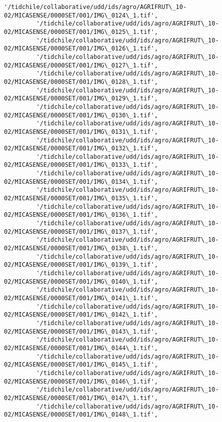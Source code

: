 \documentclass[11pt]{article}
\begin{document}
\begin{Verbatim}[commandchars=\\\{\}]
         '/tidchile/collaborative/udd/ids/agro/AGRIFRUT\_10-02/MICASENSE/0000SET/001/IMG\_0124\_1.tif',
         '/tidchile/collaborative/udd/ids/agro/AGRIFRUT\_10-02/MICASENSE/0000SET/001/IMG\_0125\_1.tif',
         '/tidchile/collaborative/udd/ids/agro/AGRIFRUT\_10-02/MICASENSE/0000SET/001/IMG\_0126\_1.tif',
         '/tidchile/collaborative/udd/ids/agro/AGRIFRUT\_10-02/MICASENSE/0000SET/001/IMG\_0127\_1.tif',
         '/tidchile/collaborative/udd/ids/agro/AGRIFRUT\_10-02/MICASENSE/0000SET/001/IMG\_0128\_1.tif',
         '/tidchile/collaborative/udd/ids/agro/AGRIFRUT\_10-02/MICASENSE/0000SET/001/IMG\_0129\_1.tif',
         '/tidchile/collaborative/udd/ids/agro/AGRIFRUT\_10-02/MICASENSE/0000SET/001/IMG\_0130\_1.tif',
         '/tidchile/collaborative/udd/ids/agro/AGRIFRUT\_10-02/MICASENSE/0000SET/001/IMG\_0131\_1.tif',
         '/tidchile/collaborative/udd/ids/agro/AGRIFRUT\_10-02/MICASENSE/0000SET/001/IMG\_0132\_1.tif',
         '/tidchile/collaborative/udd/ids/agro/AGRIFRUT\_10-02/MICASENSE/0000SET/001/IMG\_0133\_1.tif',
         '/tidchile/collaborative/udd/ids/agro/AGRIFRUT\_10-02/MICASENSE/0000SET/001/IMG\_0134\_1.tif',
         '/tidchile/collaborative/udd/ids/agro/AGRIFRUT\_10-02/MICASENSE/0000SET/001/IMG\_0135\_1.tif',
         '/tidchile/collaborative/udd/ids/agro/AGRIFRUT\_10-02/MICASENSE/0000SET/001/IMG\_0136\_1.tif',
         '/tidchile/collaborative/udd/ids/agro/AGRIFRUT\_10-02/MICASENSE/0000SET/001/IMG\_0137\_1.tif',
         '/tidchile/collaborative/udd/ids/agro/AGRIFRUT\_10-02/MICASENSE/0000SET/001/IMG\_0138\_1.tif',
         '/tidchile/collaborative/udd/ids/agro/AGRIFRUT\_10-02/MICASENSE/0000SET/001/IMG\_0139\_1.tif',
         '/tidchile/collaborative/udd/ids/agro/AGRIFRUT\_10-02/MICASENSE/0000SET/001/IMG\_0140\_1.tif',
         '/tidchile/collaborative/udd/ids/agro/AGRIFRUT\_10-02/MICASENSE/0000SET/001/IMG\_0141\_1.tif',
         '/tidchile/collaborative/udd/ids/agro/AGRIFRUT\_10-02/MICASENSE/0000SET/001/IMG\_0142\_1.tif',
         '/tidchile/collaborative/udd/ids/agro/AGRIFRUT\_10-02/MICASENSE/0000SET/001/IMG\_0143\_1.tif',
         '/tidchile/collaborative/udd/ids/agro/AGRIFRUT\_10-02/MICASENSE/0000SET/001/IMG\_0144\_1.tif',
         '/tidchile/collaborative/udd/ids/agro/AGRIFRUT\_10-02/MICASENSE/0000SET/001/IMG\_0145\_1.tif',
         '/tidchile/collaborative/udd/ids/agro/AGRIFRUT\_10-02/MICASENSE/0000SET/001/IMG\_0146\_1.tif',
         '/tidchile/collaborative/udd/ids/agro/AGRIFRUT\_10-02/MICASENSE/0000SET/001/IMG\_0147\_1.tif',
         '/tidchile/collaborative/udd/ids/agro/AGRIFRUT\_10-02/MICASENSE/0000SET/001/IMG\_0148\_1.tif',

\end{Verbatim}
\end{document}
